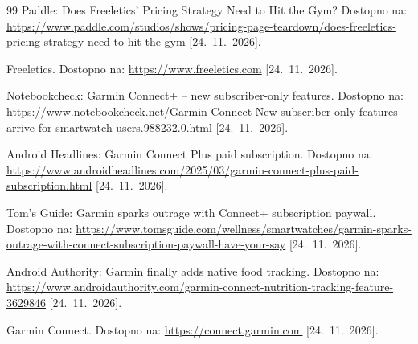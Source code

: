 \documentclass[11pt,a4paper]{article}
\begin{document}
\begin{thebibliography}{99}
 Paddle: Does Freeletics' Pricing Strategy Need to Hit the Gym? Dostopno na: \url{https://www.paddle.com/studios/shows/pricing-page-teardown/does-freeletics-pricing-strategy-need-to-hit-the-gym} [24.~11.~2026].

 Freeletics. Dostopno na: \url{https://www.freeletics.com} [24.~11.~2026].

 Notebookcheck: Garmin Connect+ -- new subscriber-only features. Dostopno na: \url{https://www.notebookcheck.net/Garmin-Connect-New-subscriber-only-features-arrive-for-smartwatch-users.988232.0.html} [24.~11.~2026].

 Android Headlines: Garmin Connect Plus paid subscription. Dostopno na: \url{https://www.androidheadlines.com/2025/03/garmin-connect-plus-paid-subscription.html} [24.~11.~2026].

 Tom's Guide: Garmin sparks outrage with Connect+ subscription paywall. Dostopno na: \url{https://www.tomsguide.com/wellness/smartwatches/garmin-sparks-outrage-with-connect-subscription-paywall-have-your-say} [24.~11.~2026].

 Android Authority: Garmin finally adds native food tracking. Dostopno na: \url{https://www.androidauthority.com/garmin-connect-nutrition-tracking-feature-3629846} [24.~11.~2026].

 Garmin Connect. Dostopno na: \url{https://connect.garmin.com} [24.~11.~2026].

\end{thebibliography}
\end{document}
